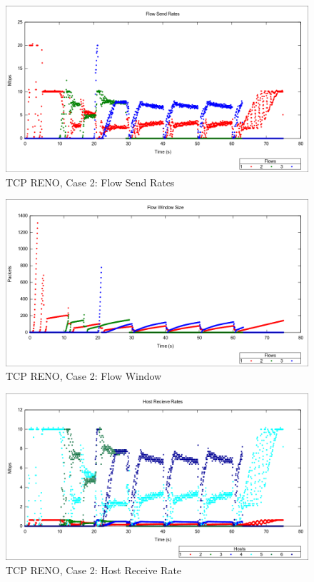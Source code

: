 \begin{figure}[htbp]
    \centering
    \includegraphics[width=\textwidth]{reno2/Flow_Send_Rates.png}
    \caption{TCP RENO, Case 2: Flow Send Rates}
\end{figure}

\begin{figure}[htbp]
    \centering
    \includegraphics[width=\textwidth]{reno2/Flow_Window.png}
    \caption{TCP RENO, Case 2: Flow Window}
\end{figure}

\begin{figure}[htbp]
    \centering
    \includegraphics[width=\textwidth]{reno2/Host_Receive.png}
    \caption{TCP RENO, Case 2: Host Receive Rate}
\end{figure}


